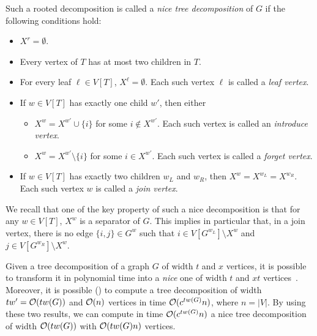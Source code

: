 \documentclass[12pt]{article}
\begin{document}
\begin{appendix}
Such a rooted decomposition is called a \emph{nice tree decomposition} of $G$ if the following conditions hold:
\begin{itemize}

\item $X^{r} = \emptyset$.
\item Every vertex of $T$ has at most two children in $T$.
\item For every leaf $\ell \in V[T]$, $X^{\ell} = \emptyset$. Each such vertex $\ell$ is called a {\em leaf vertex}.
\item If $w \in V[T]$ has exactly one child $w'$, then either
  \begin{itemize}
  \item $X^w = X^{w'}\cup \{i\}$ for some $i \not \in X^{w'}$.
    Each such vertex is called an \emph{introduce vertex}.%
  \item $X^w = X^{w'} \setminus \{i\}$ for some $i \in X^{w'}$.
    Each such vertex is called a \emph{forget vertex}. %
  \end{itemize}
\item If $w \in V[T]$ has exactly two children $w_L$ and $w_R$, then $X^{w} = X^{w_L} = X^{w_R}$. %
 Each such vertex $w$ is called a \emph{join vertex}.
\end{itemize}
We recall that one of the key property of such a nice decomposition is that for any $w \in V[T]$, $X^w$ is a separator of $G$.
This implies in particular that, in a join vertex, there is no edge $\{i,j\}\in G^w$ such that $i \in V[G^{w_L}] \setminus X^w$ and $j \in V[G^{w_R}] \setminus X^w$.

Given a tree decomposition of a graph $G$ of width $t$ and $x$ vertices, it is possible to transform it in polynomial time into a \emph{nice} one of width $t$ and $xt$ vertices~\citep{Klo94}.
Moreover, it is possible (\cite{DBLP:journals/corr/abs-1304-6321}) to compute a tree decomposition of width $tw' = \mathcal{O}(tw(G))$ and $\mathcal{O}(n)$ vertices in time $\mathcal{O}(c^{tw(G)}n)$, where $n = |V|$.
By using these two results, we can compute in time $\mathcal{O}(c^{tw(G)}n)$ a nice tree decomposition of width $\mathcal{O}(tw(G))$ with $\mathcal{O}(tw(G)n)$ vertices.


\end{appendix}
\end{document}
